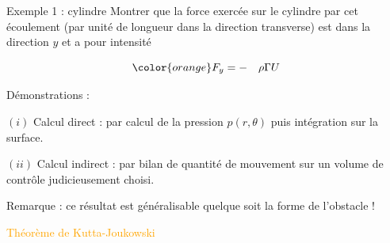 \begin{frame}{Exemple 1 : cylindre}
Montrer que la force exercée sur le cylindre par cet écoulement (par unité de longueur dans la direction transverse) est dans la direction $y$ et a pour intensité 

$${\color{orange} F_y =    - \quad \rho \Gamma U }$$ 


\medskip

{\color{vert}Démonstrations :}

$(i)$ Calcul direct : par calcul de la pression $p(r,\theta)$ puis intégration sur la surface.

$(ii)$ Calcul indirect : par bilan de quantité de mouvement sur un volume de contrôle judicieusement choisi. 

\pause
\smallskip Remarque : ce résultat est généralisable quelque soit la forme de l'obstacle !

\textcolor{orange}{Théorème de Kutta-Joukowski}



\vspace{0mm}
\end{frame}

%
%
%
%
%
%
%
%
%
%
%
%
%
%
%
%
%
%
%
%
%
%

